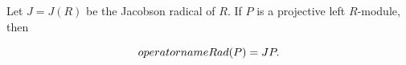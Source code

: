 Let $J = J(R)$ be the Jacobson radical of $R$. If $P$ is a projective left $R$-module, then

$$\\operatorname{Rad}(P) = JP.$$
